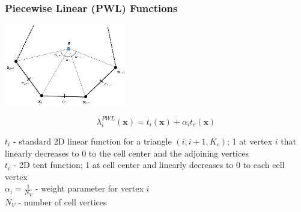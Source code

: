 \documentclass[compress,10pt]{beamer}
\renewcommand{\vec}[1]{\mathbf{#1}}
\begin{document}
\begin{frame}[t]\frametitle{Piecewise Linear (PWL) Functions}
\centering
\includegraphics[width=0.40\textwidth]{images/ref_polygon.png}
\vspace{0.3cm}
\begin{block}{}
\begin{equation*}
\lambda_i^{PWL} (\vec{x}) =  t_i (\vec{x}) + \alpha_i t_c (\vec{x})
\end{equation*}
\end{block}
\begin{block}{}
$t_i $ - standard 2D linear function for a triangle $(i,i+1,K_c)$; 1 at vertex $i$ that linearly decreases to 0 to the cell center and the adjoining vertices \\ \vspace{1mm}
$t_c$ - 2D tent function; 1 at cell center and linearly decreases to 0 to each cell vertex \\ \vspace{1mm}
$\alpha_i = \frac{1}{N_V}$ - weight parameter for vertex $i$ \\ \vspace{1mm}
$N_V$ - number of cell vertices
\end{block}
\end{frame}
\end{document}
